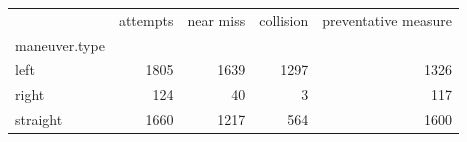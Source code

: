 \begin{tabular}{lrrrr}
\toprule
 & attempts & near miss & collision & preventative measure \\
maneuver.type &  &  &  &  \\
\midrule
left & 1805 & 1639 & 1297 & 1326 \\
right & 124 & 40 & 3 & 117 \\
straight & 1660 & 1217 & 564 & 1600 \\
\bottomrule
\end{tabular}
